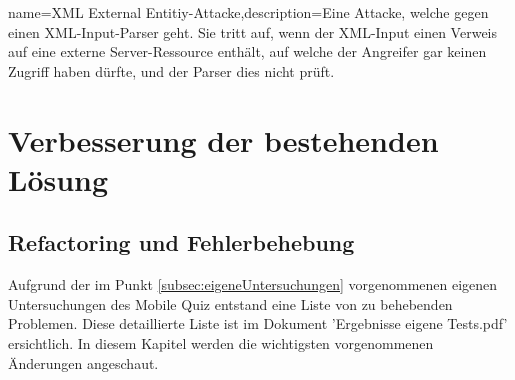
 {name={XML External Entitiy-Attacke},description={Eine Attacke, welche gegen einen XML-Input-Parser geht. Sie tritt auf, wenn der XML-Input einen Verweis auf eine externe Server-Ressource enthält, auf welche der Angreifer gar keinen Zugriff haben dürfte, und der Parser dies nicht prüft. \cite{xxe}}}






\section{Verbesserung der bestehenden Lösung}

\subsection{\gls{Refactoring} und Fehlerbehebung}

Aufgrund der im Punkt \ref{subsec:eigeneUntersuchungen} vorgenommenen eigenen Untersuchungen des Mobile Quiz entstand eine Liste von zu behebenden Problemen. Diese detaillierte Liste ist im Dokument 'Ergebnisse eigene Tests.pdf' ersichtlich. In diesem Kapitel werden die wichtigsten vorgenommenen Änderungen angeschaut.

